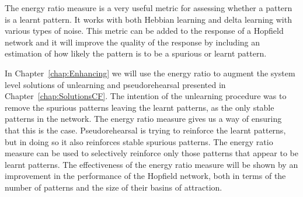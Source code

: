 The energy ratio measure is a very useful metric for assessing whether a pattern is a learnt pattern.  It works with both Hebbian learning and delta learning with various types of noise.  This metric can be added to the response of a Hopfield network and it will improve the quality of the response by including an estimation of how likely the pattern is to be a spurious or learnt pattern.

In Chapter~\ref{chap:Enhancing} we will use the energy ratio to augment the system level solutions of unlearning and pseudorehearsal presented in Chapter~\ref{chap:SolutionsCF}.  The intention of the unlearning procedure was to remove the spurious patterns leaving the learnt patterns, as the only stable patterns in the network.  The energy ratio measure gives us a way of ensuring that this is the case. Pseudorehearsal is trying to reinforce the learnt patterns, but in doing so it also reinforces stable spurious patterns.  The energy ratio measure can be used to selectively reinforce only those patterns that appear to be learnt patterns.  The effectiveness of the energy ratio measure will be shown by an improvement in the performance of the Hopfield network, both in terms of the number of patterns and the size of their basins of attraction.
